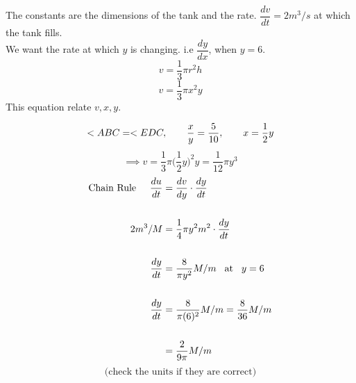 \documentclass[11pt,a4paper]{article}
\begin{document}
The constants are the dimensions of the tank and the rate. $\dfrac{dv}{dt}=2m^3/s$ at which the tank fills.\\
We want the rate at which $y$ is changing. i.e $\dfrac{dy}{dx}$, when $y=6$.\\


$$v=\frac{1}{3}\pi r^2h$$
$$v=\frac{1}{3}\pi x^2y$$
This equation relate $v,x,y$.\\









\begin{figure}[h!]
\centering
{}
\end{figure}










$$ <ABC= <EDC,\hspace{0.7cm} \frac{x}{y}=\frac{5}{10},\hspace{0.7cm} x=\frac{1}{2}y$$
$$\implies v=\frac{1}{3}\pi \bigg(\frac{1}{2}y\bigg)^2y=\frac{1}{12}\pi y^3$$
\begin{align*}
\text{Chain Rule}\hspace{0.5cm} \frac{du}{dt} & =\dfrac{dv}{dy}\cdot \frac{dy}{dt}\\\\
2m^3/M & = \frac{1}{4}\pi y^2m^2\cdot \frac{dy}{dt}\\\\
\frac{dy}{dt} & = \frac{8}{\pi y^2}M/m \hspace{0.3cm} \text{at}\hspace{0.3cm} y=6\\\\
\frac{dy}{dt} & = \frac{8}{\pi (6)^2}M/m=\frac{8}{36}M/m\\\\
              & = \frac{2}{9\pi}M/m
\end{align*}
$$\text{(check the units if they are correct)}$$\\
\end{document}
